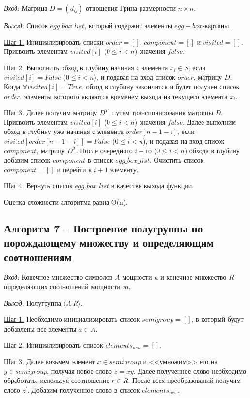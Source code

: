\documentclass[bachelor, och, labwork]{shiza}
\begin{document}
      \textit{Вход}: Матрица $D = (d_{ij})$ отношения Грина размерности $n \times n$.

      \textit{Выход}: Список $egg\_box\_list$, который содержит элементы $egg-box$-картины.

      \underline{Шаг 1.} Инициализировать списки $order = []$, $component = []$ и $visited = []$. Присвоить элементам $visited[i]$ ($0 \leq i < n$)
      значения $false$.

      \underline{Шаг 2.} Выполнить обход в глубину начиная с элемента $x_i \in S$, если $visited[i] = False$ ($0 \leq i < n$), и подавая на вход список 
      $order$, матрицу $D$. Когда $\forall visited[i] = True$, обход в глубину закончится и будет получен список $order$, элементы которого являются временем выхода
      из текущего элемента $x_i$.
      
      \underline{Шаг 3.} Далее получим матрицу $D^T$, путем транспонирования матрицы $D$. Присвоить элементам $visited[i]$ ($0 \leq i < n$)
      значения $false$. Далее выполним обход в глубину уже начиная с элемента $order[n - 1 - i]$, если $visited[order[n - 1 - i]] = False$ ($0 \leq i < n$),
      и подавая на вход список $component$, матрицу $D^T$. После очередного $i-го$ ($0 \leq i < n$) обхода в глубину добавим список $component$ в список
      $egg\_box\_list$. Очистить список $component = []$ и перейти к $i + 1$ элементу.
      
      \underline{Шаг 4.} Вернуть список $egg\_box\_list$ в качестве выхода функции. 


      Оценка сложности алгоритма равна O(n).

    
      \subsection{Алгоритм 7 -- Построение полугруппы по порождающему множеству и определяющим соотношениям}

      \textit{Вход}: Конечное множество символов $A$ мощности $n$ и конечное множество $R$ определяющих соотношений мощности $m$.

      \textit{Выход}: Полугруппа $\langle A | R \rangle$.

      \underline{Шаг 1.} Необходимо инициализировать список $semigroup = []$, в который будут добавлены все элементы $a \in A$.

      \underline{Шаг 2.} Инициализировать список $elements_{new} = []$.

      \underline{Шаг 3.} Далее возьмем элемент $x \in semigroup$ и <<умножим>> его на $y \in semigroup$, получая новое слово
      $z = xy$. Далее полученное слово необходимо обработать, используя соотношение $r \in R$. После всех преобразований получим слово $z^{'}$.
      Добавим полученное слово в список $elements_{new}$.
\end{document}

